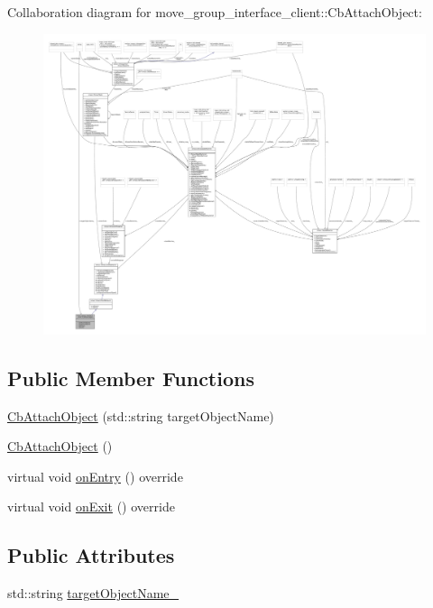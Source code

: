 Collaboration diagram for move\+\_\+group\+\_\+interface\+\_\+client\+:\+:Cb\+Attach\+Object\+:
\nopagebreak
\begin{figure}[H]
\begin{center}
\leavevmode
\includegraphics[width=350pt]{classmove__group__interface__client_1_1CbAttachObject__coll__graph}
\end{center}
\end{figure}
\subsection*{Public Member Functions}
\begin{DoxyCompactItemize}
\item 
\hyperlink{classmove__group__interface__client_1_1CbAttachObject_a988cee451be9199ed6a7e49446635221}{Cb\+Attach\+Object} (std\+::string target\+Object\+Name)
\item 
\hyperlink{classmove__group__interface__client_1_1CbAttachObject_aadb8c5d4e0dfbefc054276da7ecfcbc3}{Cb\+Attach\+Object} ()
\item 
virtual void \hyperlink{classmove__group__interface__client_1_1CbAttachObject_a85ddd1ee5d0057fe489de10007982f22}{on\+Entry} () override
\item 
virtual void \hyperlink{classmove__group__interface__client_1_1CbAttachObject_a99efdfdd854a2a9633c92b33a78fcd34}{on\+Exit} () override
\end{DoxyCompactItemize}
\subsection*{Public Attributes}
\begin{DoxyCompactItemize}
\item 
std\+::string \hyperlink{classmove__group__interface__client_1_1CbAttachObject_a3d2591373f673a8479025044138bd82b}{target\+Object\+Name\+\_\+}
\end{DoxyCompactItemize}
